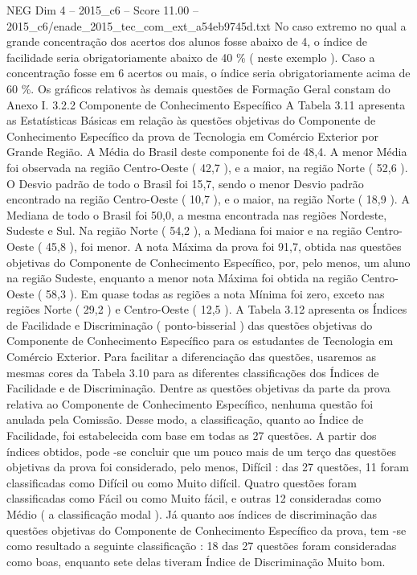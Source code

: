 \begin{textsample}{NEG Dim 4 – 2015\_c6 – Score 11.00 – 2015\_c6/enade\_2015\_tec\_com\_ext\_a54eb9745d.txt}
No caso extremo no qual a grande concentração dos acertos dos alunos fosse abaixo de 4, o índice de facilidade seria obrigatoriamente abaixo de 40 \% ( neste exemplo ).
Caso a concentração fosse em 6 acertos ou mais, o índice seria obrigatoriamente acima de 60 \%.
Os gráficos relativos às demais questões de Formação Geral constam do Anexo I. 3.2.2 Componente de Conhecimento Específico A Tabela 3.11 apresenta as Estatísticas Básicas em relação às questões objetivas do Componente de Conhecimento Específico da prova de Tecnologia em Comércio Exterior por Grande Região.
A Média do Brasil deste componente foi de 48,4.
A menor Média foi observada na região Centro-Oeste ( 42,7 ), e a maior, na região Norte ( 52,6 ).
O Desvio padrão de todo o Brasil foi 15,7, sendo o menor Desvio padrão encontrado na região Centro-Oeste ( 10,7 ), e o maior, na região Norte ( 18,9 ).
A Mediana de todo o Brasil foi 50,0, a mesma encontrada nas regiões Nordeste, Sudeste e Sul.
Na região Norte ( 54,2 ), a Mediana foi maior e na região Centro-Oeste ( 45,8 ), foi menor.
A nota Máxima da prova foi 91,7, obtida nas questões objetivas do Componente de Conhecimento Específico, por, pelo menos, um aluno na região Sudeste, enquanto a menor nota Máxima foi obtida na região Centro-Oeste ( 58,3 ).
Em quase todas as regiões a nota Mínima foi zero, exceto nas regiões Norte ( 29,2 ) e Centro-Oeste ( 12,5 ).
A Tabela 3.12 apresenta os Índices de Facilidade e Discriminação ( ponto-bisserial ) das questões objetivas do Componente de Conhecimento Específico para os estudantes de Tecnologia em Comércio Exterior.
Para facilitar a diferenciação das questões, usaremos as mesmas cores da Tabela 3.10 para as diferentes classificações dos Índices de Facilidade e de Discriminação.
Dentre as questões objetivas da parte da prova relativa ao Componente de Conhecimento Específico, nenhuma questão foi anulada pela Comissão.
Desse modo, a classificação, quanto ao Índice de Facilidade, foi estabelecida com base em todas as 27 questões.
A partir dos índices obtidos, pode -se concluir que um pouco mais de um terço das questões objetivas da prova foi considerado, pelo menos, Difícil : das 27 questões, 11 foram classificadas como Difícil ou como Muito difícil.
Quatro questões foram classificadas como Fácil ou como Muito fácil, e outras 12 consideradas como Médio ( a classificação modal ).
Já quanto aos índices de discriminação das questões objetivas do Componente de Conhecimento Específico da prova, tem -se como resultado a seguinte classificação : 18 das 27 questões foram consideradas como boas, enquanto sete delas tiveram Índice de Discriminação Muito bom.

\end{textsample}
